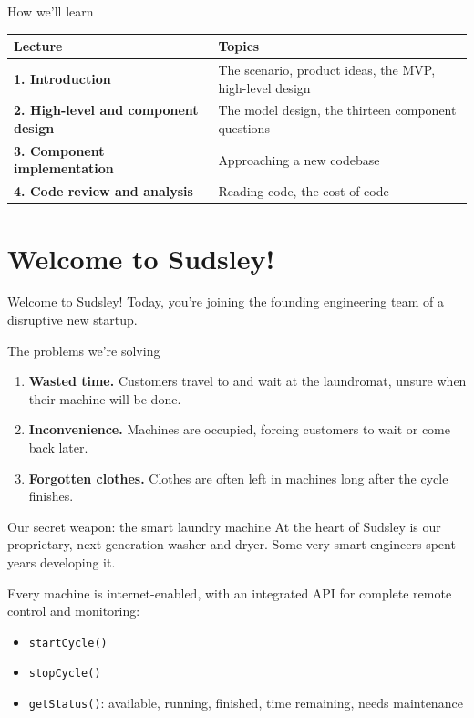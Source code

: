 \documentclass[aspectratio=169]{beamer}
\begin{document}
\begin{frame}{How we'll learn}
  \centering
  \begin{tabularx}{\textwidth}{@{}>{\bfseries}l X@{}}
    \toprule
    Lecture & Topics \\
    \midrule
    1. Introduction & The scenario, product ideas, the MVP, high-level design \\
    2. High-level and component design & The model design, the thirteen component questions \\
    3. Component implementation & Approaching a new codebase \\
    4. Code review and analysis & Reading code, the cost of code \\
    \bottomrule
  \end{tabularx}
\end{frame}

\section{Welcome to Sudsley!}

\begin{frame}{Welcome to Sudsley!}
  \Large Today, you're joining the founding engineering team of a disruptive new startup.
\end{frame}

\begin{frame}{The problems we're solving}
  \begin{enumerate}
    \item<1-> \textbf{Wasted time.} Customers travel to and wait at the laundromat, unsure
      when their machine will be done.
    \item<2-> \textbf{Inconvenience.} Machines are occupied, forcing customers to wait or
      come back later.
    \item<3-> \textbf{Forgotten clothes.} Clothes are often left in machines long after the
      cycle finishes.
  \end{enumerate}
\end{frame}

\begin{frame}{Our secret weapon: the smart laundry machine}
  At the heart of Sudsley is our proprietary, next-generation washer and dryer. Some very
  smart engineers spent years developing it.

  \bigskip
  Every machine is internet-enabled, with an integrated API for complete remote control and
  monitoring:
  \begin{itemize}
    \item \texttt{startCycle()}
    \item \texttt{stopCycle()}
    \item \texttt{getStatus()}: available, running, finished, time remaining, needs
      maintenance
  \end{itemize}
\end{frame}
\end{document}
